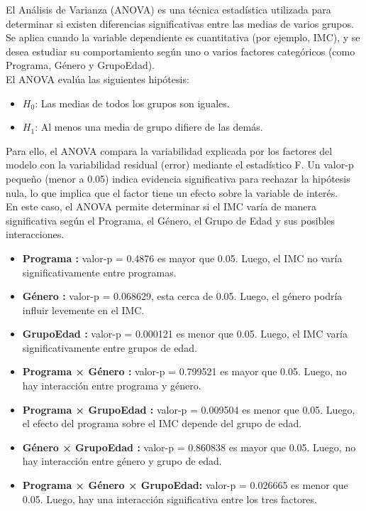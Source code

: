 \documentclass{rapport}
\begin{document}
El Análisis de Varianza (ANOVA) es una técnica estadística utilizada para determinar si existen diferencias significativas entre las medias de varios grupos. Se aplica cuando la variable dependiente es cuantitativa (por ejemplo, IMC), y se desea estudiar su comportamiento según uno o varios factores categóricos (como Programa, Género y GrupoEdad).\\

El ANOVA evalúa las siguientes hipótesis:

\begin{itemize}
    \item \( H_0 \): Las medias de todos los grupos son iguales.
    \item \( H_1 \): Al menos una media de grupo difiere de las demás.
\end{itemize}

Para ello, el ANOVA compara la variabilidad explicada por los factores del modelo con la variabilidad residual (error) mediante el estadístico F. Un valor-p pequeño (menor a 0.05) indica evidencia significativa para rechazar la hipótesis nula, lo que implica que el factor tiene un efecto sobre la variable de interés.\\

En este caso, el ANOVA permite determinar si el IMC varía de manera significativa según el Programa, el Género, el Grupo de Edad y sus posibles interacciones.

\begin{itemize}
    \item \textbf{Programa : }valor-p = 0.4876 es mayor que 0.05. Luego, el IMC no varía significativamente entre programas.
    
    \item \textbf{Género : }valor-p = 0.068629, esta cerca de 0.05. Luego, el género podría influir levemente en el IMC.
    
    \item \textbf{GrupoEdad :} valor-p = 0.000121 es menor que 0.05. Luego, el IMC varía significativamente entre grupos de edad.
    
    \item \textbf{Programa × Género :} valor-p = 0.799521 es mayor que 0.05. Luego, no hay interacción entre programa y género.
    
    \item \textbf{Programa × GrupoEdad :} valor-p = 0.009504 es menor que 0.05. Luego, el efecto del programa sobre el IMC depende del grupo de edad.
    
    \item \textbf{Género × GrupoEdad :} valor-p = 0.860838 es mayor que 0.05. Luego, no hay interacción entre género y grupo de edad.
    
    \item \textbf{Programa × Género × GrupoEdad:} valor-p = 0.026665 es menor que 0.05. Luego, hay una interacción significativa entre los tres factores.
\end{itemize}
\end{document}
